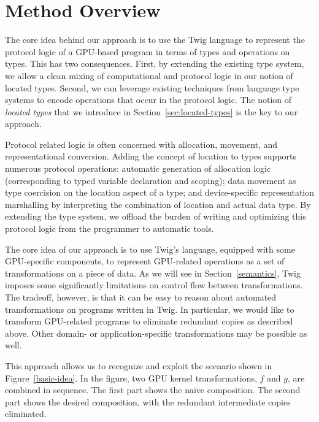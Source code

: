 
\section{Method Overview}


The core idea behind our approach is to use the Twig language to
represent the protocol logic of a GPU-based program in terms of types
and operations on types.  This has two consequences.  First, by
extending the existing type system, we allow a clean mixing of
computational and protocol logic in our notion of located types.
Second, we can leverage existing techniques from language type systems
to encode operations that occur in the protocol logic.  The notion of
\emph{located types} that we introduce in
Section~\ref{sec:located-types} is the key to our approach.

Protocol related logic is often concerned with allocation, movement,
and representational conversion.  Adding the concept of location to
types supports numerous protocol operations: automatic generation of
allocation logic (corresponding to typed variable declaration and
scoping); data movement as type coercision on the location aspect of a
type; and device-specific representation marshalling by interpreting
the combination of location and actual data type.  By extending the 
type system, we offload the burden of writing and optimizing this
protocol logic from the programmer to automatic tools.


The core idea of our approach is to use Twig's language, equipped with some
GPU-specific components, to represent GPU-related operations as a set of
transformations on a piece of data. As we will see in Section~\ref{semantics},
Twig imposes some significantly limitations on control flow between
transformations. The tradeoff, however, is that it can be easy to reason about
automated transformations on programs written in Twig. In particular, we would
like to transform GPU-related programs to eliminate redundant copies as
described above. Other domain- or application-specific transformations may be
possible as well.

This approach allows us to recognize and exploit the scenario shown in
Figure~\ref{basic-idea}. In the figure, two GPU kernel transformations, $f$ and
$g$, are combined in sequence. The first part shows the na\"ive composition. The
second part shows the desired composition, with the redundant intermediate
copies eliminated.


